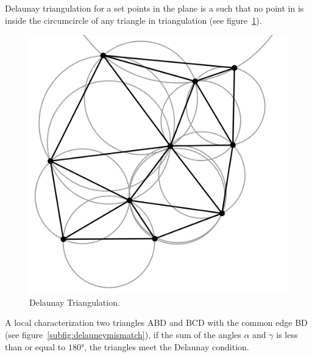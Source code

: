 Delaunay triangulation for a set points in the plane is a such that no point in is inside the circumcircle of any triangle in triangulation (see figure~\ref{fig:delaunaycircum}).
%
\begin{figure}[htbp]
    \centering
    \includegraphics[width=\linewidth]{figures/appendix/delaunay.png}
    \caption{Delaunay Triangulation.}\label{fig:delaunaycircum}
\end{figure}
%
A local characterization two triangles ABD and BCD with the common edge BD (see figure~\ref{subfig:delauneymismatch}), if the sum of the angles \(\alpha\) and \(\gamma\) is less than or equal to \(\ang{180}\), the triangles meet the Delaunay condition.
%
